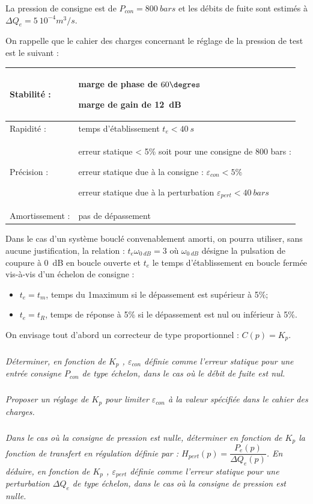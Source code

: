 \documentclass[10pt,fleqn]{article} %
\begin{document}
\begin{multicols}{2}
La pression de consigne est de $P_{con} = \SI{800}{bars}$ et les débits de fuite sont estimés à $\Delta Q_e = \SI{5}{10^{-4} m^3/s}$.

On rappelle que le cahier des charges concernant le réglage de la pression de test est le suivant :
\begin{center}
\begin{tabular}{|l|p{5cm}|}
\hline
Stabilité : & marge de phase de $60\degres$

 marge de gain de \SI{12}{dB} \\ \hline
Rapidité :	&temps d’établissement $t_e < \SI{40}{s}$ \\ \hline
Précision :&	erreur statique < 5\% soit pour une consigne de 800 bars :

erreur statique due à la consigne : $\varepsilon_{con} < 5\%$ 

erreur statique due à la perturbation $\varepsilon_{pert} < \SI{40}{bars}$ \\ \hline

Amortissement :&	pas de dépassement \\ \hline
\end{tabular}
\end{center}

Dans le cas d’un système bouclé convenablement amorti, on pourra utiliser, sans aucune justification, la relation : 	$t_e \omega_{\SI{0}{dB}}=3$ 
où $\omega_{\SI{0}{dB}}$ désigne la pulsation de coupure à \SI{0}{dB} en boucle ouverte et $t_e$ le temps d’établissement en boucle fermée vis-à-vis d’un échelon de consigne :
\begin{itemize}
\item $t_e = t_m$, temps du 1\ier maximum si le dépassement est supérieur à 5\%;
\item $t_e = t_R$, temps de réponse à 5\% si le dépassement est nul ou inférieur à 5\%.
\end{itemize}
On envisage tout d’abord un correcteur de type proportionnel : $C(p)=K_p$. 


\subparagraph{}
\textit{Déterminer, en fonction de $K_p$ , $\varepsilon_{con}$ définie comme l’erreur statique pour une entrée consigne $P_{con}$ de type échelon, dans le cas où le débit de fuite est nul.}

\subparagraph{}
\textit{Proposer un réglage de $K_p$ pour limiter $\varepsilon_{con}$ à la valeur spécifiée dans le  cahier des charges.}

\subparagraph{}
\textit{Dans le cas où la consigne de pression est nulle,  déterminer en fonction de $K_p$ la fonction de transfert en régulation définie par :
$H_{pert} (p)=\dfrac{P_e (p)}{\Delta Q_e (p)}$.
En déduire, en fonction de $K_p$ , $\varepsilon_{pert}$ définie comme l’erreur statique pour une perturbation $\Delta Q_e$ de type échelon, dans le cas où la consigne de pression est nulle.}


\end{multicols}
\end{document}
